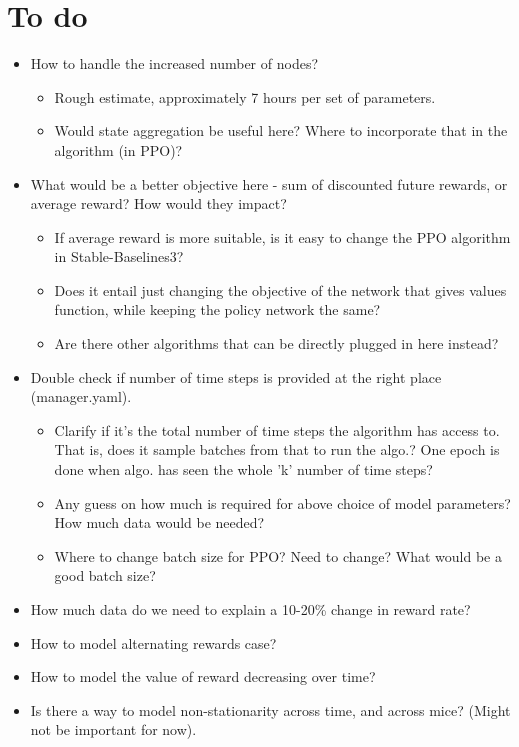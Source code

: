 \documentclass[11pt, oneside]{article}
\begin{document}
\section{To do}
\begin{itemize}
\item How to handle the increased number of nodes?
\begin{itemize}
	\item Rough estimate, approximately 7 hours per set of parameters.
	\item Would state aggregation be useful here? Where to incorporate that in the algorithm (in PPO)?
\end{itemize}	
\item What would be a better objective here - sum of discounted future rewards, or average reward? How would they impact?
\begin{itemize}
	\item If average reward is more suitable, is it easy to change the PPO algorithm in Stable-Baselines3?
	\item Does it entail just changing the objective of the network that gives values function, while keeping the policy network the same?
	\item Are there other algorithms that can be directly plugged in here instead?
\end{itemize}
\item Double check if number of time steps is provided at the right place (manager.yaml).
\begin{itemize}
	\item Clarify if it's the total number of time steps the algorithm has access to. That is, does it sample batches from that to run the algo.? One epoch is done when algo. has seen the whole 'k' number of time steps?
	\item Any guess on how much is required for above choice of model parameters? How much data would be needed?
	\item Where to change batch size for PPO? Need to change? What would be a good batch size?
\end{itemize}
\item How much data do we need to explain a 10-20\% change in reward rate?
\item How to model alternating rewards case?
\item How to model the value of reward decreasing over time?
\item Is there a way to model non-stationarity across time, and across mice? (Might not be important for now).
\end{itemize}
\end{document}
